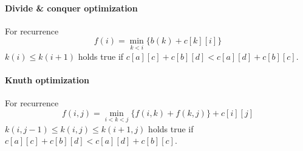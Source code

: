 \paragraph{Divide \& conquer optimization}
	For recurrence 
	$$f(i) = \min_{k<i}\{b(k)+c[k][i]\}$$
	$k(i) \leq k(i+1)$ holds true if $c[a][c]+c[b][d]<c[a][d]+c[b][c]$.
\paragraph{Knuth optimization}
	For recurrence
	$$f(i,j) = \min_{i<k<j}\{f(i,k)+f(k,j)\}+c[i][j]$$
	$k(i,j-1) \leq k(i,j) \leq k(i+1,j)$ holds true if $c[a][c]+c[b][d]<c[a][d]+c[b][c]$.

